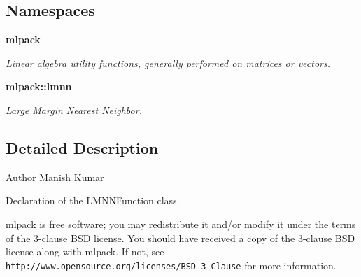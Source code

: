 \subsection*{Namespaces}
\begin{DoxyCompactItemize}
\item 
 \textbf{ mlpack}
\begin{DoxyCompactList}\small\item\em Linear algebra utility functions, generally performed on matrices or vectors. \end{DoxyCompactList}\item 
 \textbf{ mlpack\+::lmnn}
\begin{DoxyCompactList}\small\item\em Large Margin Nearest Neighbor. \end{DoxyCompactList}\end{DoxyCompactItemize}


\subsection{Detailed Description}
\begin{DoxyAuthor}{Author}
Manish Kumar
\end{DoxyAuthor}
Declaration of the L\+M\+N\+N\+Function class.

mlpack is free software; you may redistribute it and/or modify it under the terms of the 3-\/clause B\+SD license. You should have received a copy of the 3-\/clause B\+SD license along with mlpack. If not, see {\tt http\+://www.\+opensource.\+org/licenses/\+B\+S\+D-\/3-\/\+Clause} for more information. 